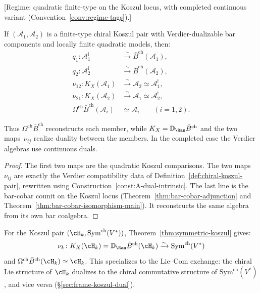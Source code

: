 \begin{theorem}\label{thm:symmetric-koszul}
\textup{[Regime: quadratic finite-type on the Koszul locus, with
completed continuous variant
\textup{(}Convention~\textup{\ref{conv:regime-tags})}.]}

If $(\mathcal{A}_1, \mathcal{A}_2)$ is a finite-type chiral Koszul
pair with Verdier-dualizable bar components and locally finite
quadratic models, then:
\begin{align}
q_1\colon\mathcal A_1^{\mathrm i}
&\xrightarrow{\sim}\bar{B}^{\mathrm{ch}}(\mathcal{A}_1),\\
q_2\colon\mathcal A_2^{\mathrm i}
&\xrightarrow{\sim}\bar{B}^{\mathrm{ch}}(\mathcal{A}_2),\\
\nu_{12}\colon K_X(\mathcal A_1)
&\xrightarrow{\sim}\mathcal{A}_2\simeq\mathcal{A}_1^!,\\
\nu_{21}\colon K_X(\mathcal A_2)
&\xrightarrow{\sim}\mathcal{A}_1\simeq\mathcal{A}_2^!,\\
\Omega^{\mathrm{ch}}\bar{B}^{\mathrm{ch}}(\mathcal{A}_i)
&\simeq \mathcal{A}_i \qquad (i=1,2).
\end{align}

Thus $\Omega^{\mathrm{ch}}\bar{B}^{\mathrm{ch}}$ reconstructs each
member, while $K_X=\mathbb D_{\Ran}\bar B^{\mathrm{ch}}$ and the two
maps~$\nu_{ij}$ realize duality between the members. In the completed
case the Verdier algebras use continuous duals.
\end{theorem}

\begin{proof}
The first two maps are the quadratic Koszul comparisons. The two
maps~$\nu_{ij}$ are exactly the Verdier compatibility data of
Definition~\ref{def:chiral-koszul-pair}, rewritten using
Construction~\ref{const:A-dual-intrinsic}. The last line is the
bar-cobar counit on the Koszul locus
(Theorem~\ref{thm:bar-cobar-adjunction} and
Theorem~\ref{thm:bar-cobar-isomorphism-main}). It reconstructs the
same algebra from its own bar coalgebra.
\end{proof}

\begin{example}\label{ex:symmetric-heisenberg}
For the Koszul pair $(\cH_k, \mathrm{Sym}^{\mathrm{ch}}(V^*))$,
Theorem~\ref{thm:symmetric-koszul} gives:
\[
\nu_k\colon K_X(\cH_k)=\mathbb{D}_{\Ran}
\bar{B}^{\mathrm{ch}}(\cH_k)
\xrightarrow{\sim} \mathrm{Sym}^{\mathrm{ch}}(V^*)
\]
and
$\Omega^{\mathrm{ch}}\bar{B}^{\mathrm{ch}}(\cH_k)\simeq\cH_k$.
This specializes to the Lie--Com exchange: the chiral Lie structure
of $\cH_k$ dualizes to the chiral commutative
structure of $\mathrm{Sym}^{\mathrm{ch}}(V^*)$, and vice versa
(\S\ref{sec:frame-koszul-dual}).
\end{example}

